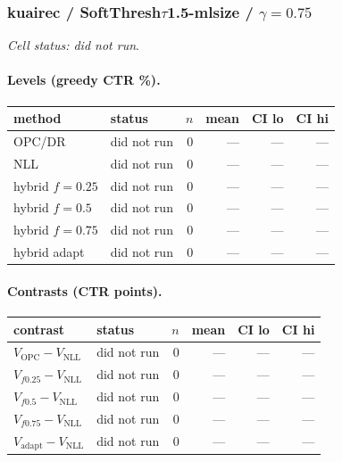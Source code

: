 \documentclass[10pt,a4paper]{article}
\begin{document}
\subsubsection{kuairec / SoftThresh$\tau$1.5-mlsize / $\gamma=0.75$}
\emph{Cell status: did not run}.
\paragraph{Levels (greedy CTR \%).}
{\centering\small\begin{tabular}{llrrrr}
\toprule method & status & $n$ & mean & CI lo & CI hi \\
\midrule
OPC/DR & did not run & 0 & --- & --- & --- \\
NLL & did not run & 0 & --- & --- & --- \\
hybrid $f{=}0.25$ & did not run & 0 & --- & --- & --- \\
hybrid $f{=}0.5$ & did not run & 0 & --- & --- & --- \\
hybrid $f{=}0.75$ & did not run & 0 & --- & --- & --- \\
hybrid adapt & did not run & 0 & --- & --- & --- \\
\bottomrule\end{tabular}\par}
\paragraph{Contrasts (CTR points).}
{\centering\small\begin{tabular}{llrrrr}
\toprule contrast & status & $n$ & mean & CI lo & CI hi \\
\midrule
$V_{\mathrm{OPC}}-V_{\mathrm{NLL}}$ & did not run & 0 & --- & --- & --- \\
$V_{f0.25}-V_{\mathrm{NLL}}$ & did not run & 0 & --- & --- & --- \\
$V_{f0.5}-V_{\mathrm{NLL}}$ & did not run & 0 & --- & --- & --- \\
$V_{f0.75}-V_{\mathrm{NLL}}$ & did not run & 0 & --- & --- & --- \\
$V_{\mathrm{adapt}}-V_{\mathrm{NLL}}$ & did not run & 0 & --- & --- & --- \\
\bottomrule\end{tabular}\par}
\end{document}
